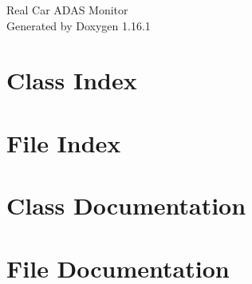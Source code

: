 \documentclass[twoside]{book}
\newcommand{\+}{\discretionary{\mbox{\scriptsize$\hookleftarrow$}}{}{}}
\newcommand{\clearemptydoublepage}{%
    \newpage{\pagestyle{empty}\cleardoublepage}%
  }
\begin{document}
  \raggedbottom
    \hypersetup{pageanchor=false,
                bookmarksnumbered=true,
                pdfencoding=unicode
               }
  \begin{titlepage}
  \vspace*{7cm}
  \begin{center}%
  {\Large Real Car ADAS Monitor}\\
  \vspace*{1cm}
  {\large Generated by Doxygen 1.16.1}\\
  \end{center}
  \end{titlepage}
  \clearemptydoublepage
  \tableofcontents
  \clearemptydoublepage
  \hypersetup{pageanchor=true}
\chapter{Class Index}

\chapter{File Index}

\chapter{Class Documentation}










\chapter{File Documentation}






  \backmatter
  \newpage
  \clearemptydoublepage
  \printindex
\end{document}
